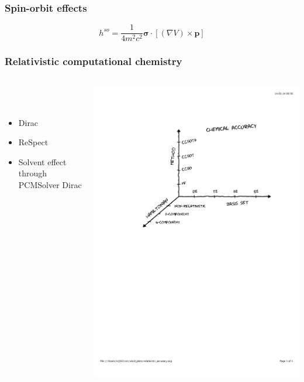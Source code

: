\documentclass[mathserif,10pt]{beamer}
\begin{document}
\begin{frame}
    \frametitle{Spin-orbit effects}
    \begin{equation}
	\nonumber
	h^{so} = \frac{1}{4m^2c^2}\boldsymbol{\sigma}\cdot\left[\left(\nabla V\right)\times\boldsymbol{p}\right]
    \end{equation}
\end{frame}

\begin{frame}
    \frametitle{Relativistic computational chemistry}
    \begin{columns}
    \begin{column}{.40\textwidth}
    \ \\
    \ \\
    \begin{itemize}
	\item Dirac
	\item ReSpect
	\item Solvent effect through PCMSolver Dirac
    \end{itemize}
    \ \\
    \end{column}
    \begin{column}{.60\textwidth}
	\centering
	\includegraphics[viewport = 100 400 600 800, clip, scale=0.3]{figures/relativistic_accuracy.pdf}
    \end{column}
    \end{columns}
\end{frame}
\end{document}

